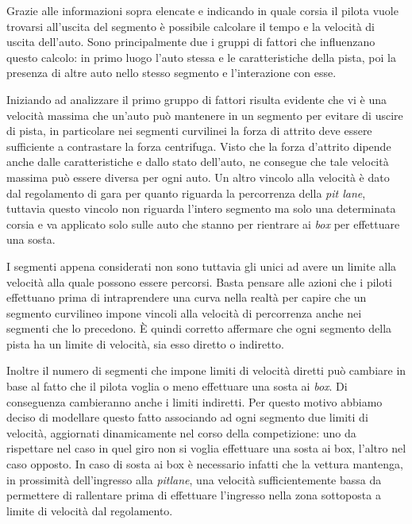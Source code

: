 \documentclass[11pt,a4paper]{report}
\begin{document}
Grazie alle informazioni sopra elencate e indicando in quale corsia il pilota vuole trovarsi all'uscita del segmento è possibile calcolare il tempo e la velocità di uscita dell'auto. Sono principalmente due i gruppi di fattori che influenzano questo calcolo: in primo luogo l'auto stessa e le caratteristiche della pista, poi la presenza di altre auto nello stesso segmento e l'interazione con esse.

Iniziando ad analizzare il primo gruppo di fattori risulta evidente che vi è una velocità massima che un'auto può mantenere in un segmento per evitare di uscire di pista, in particolare nei segmenti curvilinei la forza di attrito deve essere sufficiente a contrastare la forza centrifuga.
Visto che la forza d'attrito dipende anche dalle caratteristiche e dallo stato dell'auto, ne consegue che tale velocità massima può essere diversa per ogni auto.
Un altro vincolo alla velocità è dato dal regolamento di gara per quanto riguarda la percorrenza della \textit{pit lane}, tuttavia questo vincolo non riguarda l'intero segmento ma solo una determinata corsia e va applicato solo sulle auto che stanno per rientrare ai \textit{box} per effettuare una sosta.

I segmenti appena considerati non sono tuttavia gli unici ad avere un limite alla velocità alla quale possono essere percorsi. Basta pensare alle azioni che i piloti effettuano prima di intraprendere una curva nella realtà per capire che un segmento curvilineo impone vincoli alla velocità di percorrenza anche nei segmenti che lo precedono. \`E quindi corretto affermare che ogni segmento della pista ha un limite di velocità, sia esso diretto o indiretto.

Inoltre il numero di segmenti che impone limiti di velocità diretti può cambiare in base al fatto che il pilota voglia o meno effettuare una sosta ai \textit{box}. Di conseguenza cambieranno anche i limiti indiretti. Per questo motivo abbiamo deciso di modellare questo fatto associando ad ogni segmento due limiti di velocità, aggiornati dinamicamente nel corso della competizione: uno da rispettare nel caso in quel giro non si voglia effettuare una sosta ai box, l'altro nel caso opposto. In caso di sosta ai box è necessario infatti che la vettura mantenga, in prossimità dell'ingresso alla \textit{pitlane}, una velocità sufficientemente bassa da permettere di rallentare prima di effettuare l'ingresso nella zona sottoposta a limite di velocità dal regolamento.
\end{document}
